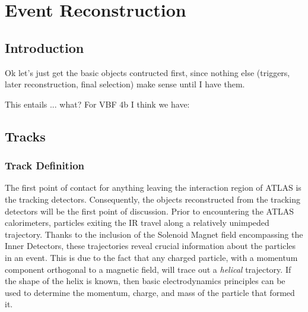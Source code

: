 \chapter{Event Reconstruction}

%


    \section{Introduction}
        Ok let's just get the basic objects contructed first, since nothing else (triggers, later reconstruction, final selection)
            make sense until I have them.

        This entails ... what? For VBF 4b I think we have:


    \section{Tracks}
            
        \subsection{Track Definition}
            
            The first point of contact for anything leaving the interaction region of ATLAS is the tracking detectors.
            Consequently, the objects reconstructed from the tracking detectors will be the first point of discussion.
            Prior to encountering the ATLAS calorimeters, particles exiting the IR travel along a relatively unimpeded trajectory.
            Thanks to the inclusion of the Solenoid Magnet field encompassing the Inner Detectors,
                these trajectories reveal crucial information about the particles in an event.
            This is due to the fact that any charged particle, with a momentum component orthogonal to a magnetic field,
                will trace out a \textit{helical} trajectory.
            If the shape of the helix is known, then basic electrodynamics principles can be used to determine the
                momentum, charge, and mass of the particle that formed it.


